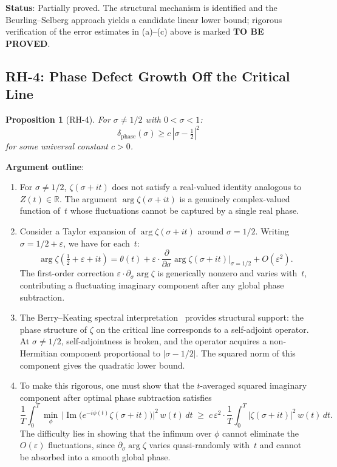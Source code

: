 \documentclass[11pt]{article}
\newtheorem{proposition}[theorem]{Proposition}
\theoremstyle{remark}
\DeclareMathOperator{\Ima}{Im}
\begin{document}
\medskip
\noindent\textbf{Status}: Partially proved.  The structural mechanism is identified
and the Beurling--Selberg approach yields a candidate linear lower bound;
rigorous verification of the error estimates in (a)--(c) above is marked
\textbf{TO BE PROVED}.

\subsection{RH-4: Phase Defect Growth Off the Critical Line}
\label{subsec:RH4}

\begin{proposition}[RH-4]
For $\sigma\neq 1/2$ with $0<\sigma<1$:
\[
  \delta_{\mathrm{phase}}(\sigma) \geq c\,|\sigma-\tfrac{1}{2}|^2
\]
for some universal constant $c>0$.
\end{proposition}

\noindent\textbf{Argument outline}:
\begin{enumerate}
  \item For $\sigma\neq 1/2$, $\zeta(\sigma+it)$ does not satisfy a
    real-valued identity analogous to $Z(t)\in\mathbb{R}$.
    The argument $\arg\zeta(\sigma+it)$ is a genuinely complex-valued function of~$t$
    whose fluctuations cannot be captured by a single real phase.

  \item Consider a Taylor expansion of $\arg\zeta(\sigma+it)$ around $\sigma=1/2$.
    Writing $\sigma=1/2+\varepsilon$, we have for each~$t$:
    \[
      \arg\zeta\!\left(\tfrac{1}{2}+\varepsilon+it\right)
      = \theta(t) + \varepsilon\cdot\frac{\partial}{\partial\sigma}\arg\zeta(\sigma+it)
        \bigg|_{\sigma=1/2} + O(\varepsilon^2).
    \]
    The first-order correction $\varepsilon\cdot\partial_\sigma\arg\zeta$ is
    generically nonzero and varies with~$t$, contributing a fluctuating imaginary
    component after any global phase subtraction.

  \item The Berry--Keating spectral interpretation~\cite{BK} provides structural support:
    the phase structure of $\zeta$ on the critical line corresponds to a self-adjoint
    operator.
    At $\sigma\neq 1/2$, self-adjointness is broken, and the operator acquires a
    non-Hermitian component proportional to $|\sigma-1/2|$.
    The squared norm of this component gives the quadratic lower bound.

  \item To make this rigorous, one must show that the $t$-averaged squared imaginary
    component after optimal phase subtraction satisfies
    \[
      \frac{1}{T}\int_0^T
      \min_{\phi}\,
      \bigl|\Ima\bigl(e^{-i\phi(t)}\zeta(\sigma+it)\bigr)\bigr|^2\,w(t)\,dt
      \;\geq\; c\,\varepsilon^2 \cdot
      \frac{1}{T}\int_0^T|\zeta(\sigma+it)|^2\,w(t)\,dt.
    \]
    The difficulty lies in showing that the infimum over $\phi$ cannot eliminate the
    $O(\varepsilon)$ fluctuations, since $\partial_\sigma\arg\zeta$ varies
    quasi-randomly with~$t$ and cannot be absorbed into a smooth global phase.
\end{enumerate}
\end{document}
